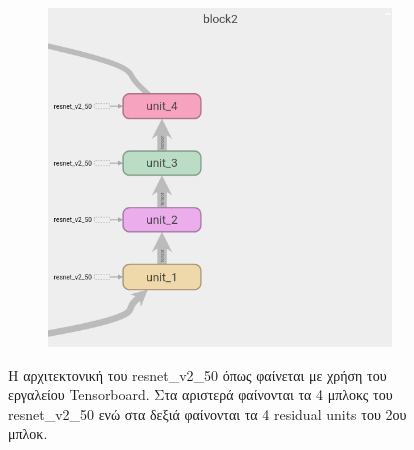 \begin{figure}[h]
\begin{subfigure}[h]{0.45\textwidth}
		\includegraphics[width=\textwidth]{images/chapter3/resnet_block_example.png}
	\end{subfigure} 
	\caption[Tensorboard - Αρχιτεκτονική του resnet\_v2\_50]{Η αρχιτεκτονική του resnet\_v2\_50 όπως φαίνεται με χρήση του εργαλείου Tensorboard. Στα αριστερά φαίνονται τα 4 μπλοκς του resnet\_v2\_50 ενώ στα δεξιά φαίνονται τα 4 residual units του 2ου μπλοκ.}
	\label{fig:resnet_block}
\end{figure}

